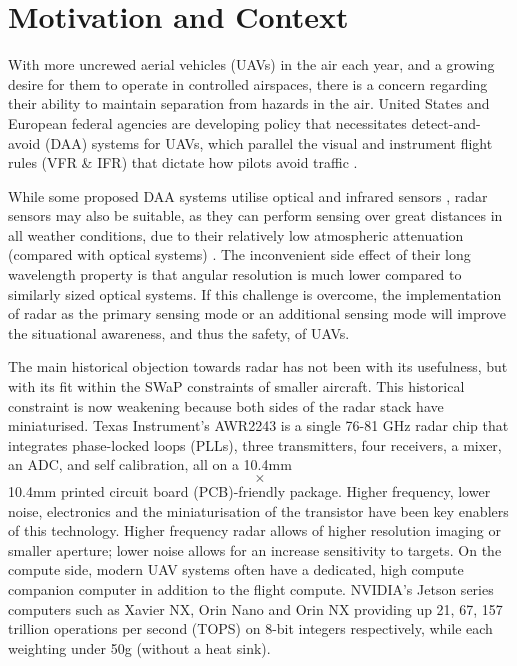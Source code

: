\section{Motivation and Context}
With more uncrewed aerial vehicles (UAVs) in the air each year, and a growing desire for them to operate in controlled airspaces, there is a concern regarding their ability to maintain separation from hazards in the air. United States and European federal agencies are developing policy that necessitates detect-and-avoid (DAA) systems for UAVs, which parallel the visual and instrument flight rules (VFR \& IFR) that dictate how pilots avoid traffic \cite{easa_easy_access_uas_2024} \cite{rtca_sc228_2025} \cite{serres_wu_2021_nasa_tm}.

While some proposed DAA systems utilise optical and infrared sensors \cite{serres_wu_2021_nasa_tm}, radar sensors may also be suitable, as they can perform sensing over great distances in all weather conditions, due to their relatively low atmospheric attenuation (compared with optical systems) \cite{borden_radar_imaging_airborne_targets_1999}. The inconvenient side effect of their long wavelength property is that angular resolution is much lower compared to similarly sized optical systems. If this challenge is overcome, the implementation of radar as the primary sensing mode or an additional sensing mode will improve the situational awareness, and thus the safety, of UAVs.

The main historical objection towards radar has not been with its usefulness, but with its fit within the SWaP constraints of smaller aircraft. This historical constraint is now weakening because both sides of the radar stack have miniaturised. Texas Instrument's AWR2243 is a single 76-81 GHz radar chip that integrates phase-locked loops (PLLs), three transmitters, four receivers, a mixer, an ADC, and self calibration, all on a 10.4mm \[\times\] 10.4mm printed circuit board (PCB)-friendly package. Higher frequency, lower noise, electronics and the miniaturisation of the transistor have been key enablers of this technology. Higher frequency radar allows of higher resolution imaging or smaller aperture; lower noise allows for an increase sensitivity to targets. On the compute side, modern UAV systems often have a dedicated, high compute companion computer in addition to the flight compute. NVIDIA's Jetson series computers such as Xavier NX, Orin Nano and Orin NX providing up 21, 67, 157 trillion operations per second (TOPS) on 8-bit integers respectively, while each weighting under 50g (without a heat sink). 

